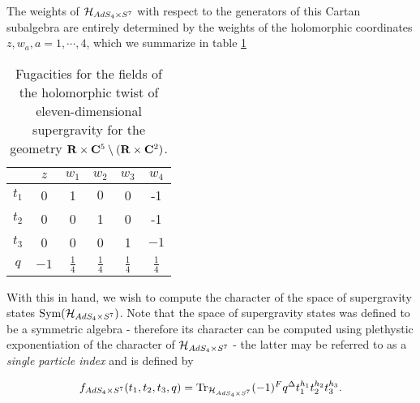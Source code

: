 \documentclass[../main.tex]{subfiles}
\begin{document}
The weights of $\mathcal{H}_{AdS_4\times S^7}$ with respect to the generators of this Cartan subalgebra are entirely determined by the weights of the holomorphic coordinates $z, w_a, a= 1, \cdots, 4$, which we summarize in table \ref{tbl:sugraM2}

\begin{table}
\begin{center}
\begin{tabular}{c c c c c c}
  & $z$ & $w_1$ & $w_2$ & $w_{3}$ & $w_{4}$ \\
  \hline
  $t_{1}$ & 0 & 1 & $0$ & 0 & -1 \\
  $t_{2}$ & 0 & 0 &  1 & 0 & -1 \\
  $t_{3}$ & 0 & 0 & 0 & 1 & $-1$ \\
  $q$ & $-1$ & $\frac14$ & $\frac14$ & $\frac14$ & $\frac14$
\end{tabular}
\caption{Fugacities for the fields of the holomorphic twist of eleven-dimensional supergravity for the geometry $\mathbf{R} \times \mathbf{C}^5 \setminus (\mathbf{R}\times \mathbf{C}^2)$.}
\label{tbl:sugraM2}
\end{center}
\end{table}

With this in hand, we wish to compute the character of the space of supergravity states $\text{Sym} (\mathcal{H}_{AdS_4\times S^7})$. Note that the space of supergravity states was defined to be a symmetric algebra - therefore its character can be computed using plethystic exponentiation of the character of $\mathcal{H}_{AdS_4\times S^7}$ - the latter may be referred to as a \textit{single particle index} and is defined by 

\[
f_{AdS_4\times S^7} (t_1, t_2, t_3, q) = \text{Tr}_{\mathcal{H}_{AdS_4\times S^7}} (-1)^F q^\Delta t_1^{h_1} t_2^{h_2} t_3^{h_3}.
\]
\end{document}
